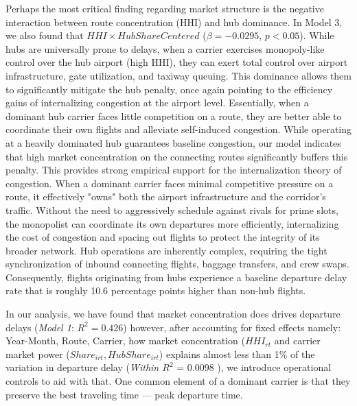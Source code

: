 \documentclass[preprint,12pt,authoryear]{elsarticle}
\begin{document}
Perhaps the most critical finding regarding market structure is the negative interaction between route concentration (HHI) and hub dominance. In Model 3, we also found that $HHI \times HubShareCentered$ ($\beta = -0.0295$, $p < 0.05$). While hubs are universally prone to delays, when a carrier exercises monopoly-like control over the hub airport (high HHI), they can exert total control over airport infrastructure, gate utilization, and taxiway queuing. This dominance allows them to significantly mitigate the hub penalty, once again pointing to the efficiency gains of internalizing congestion at the airport level. Essentially, when a dominant hub carrier faces little competition on a route, they are better able to coordinate their own flights and alleviate self-induced congestion.  While operating at a heavily dominated hub guarantees baseline congestion, our model indicates that high market concentration on the connecting routes significantly buffers this penalty. This provides strong empirical support for the internalization theory of congestion. When a dominant carrier faces minimal competitive pressure on a route, it effectively "owns" both the airport infrastructure and the corridor's traffic. Without the need to aggressively schedule against rivals for prime slots, the monopolist can coordinate its own departures more efficiently, internalizing the cost of congestion and spacing out flights to protect the integrity of its broader network. Hub operations are inherently complex, requiring the tight synchronization of inbound connecting flights, baggage transfers, and crew swaps. Consequently, flights originating from hubs experience a baseline departure delay rate that is roughly 10.6 percentage points higher than non-hub flights. 

In our analysis, we have found that market concentration does drives departure delays (\textit{Model 1}: $R^2 = 0.426$) however, after accounting for fixed effects namely: Year-Month, Route, Carrier, how market concentration ($HHI_{rt}$ and carrier market power ($Share_{irt}, HubShare_{irt}$) explains almost less than 1\% of the variation in departure delay (\textit{Within $R^2$} = $0.0098$ ), we introduce operational controls to aid with that. One common element of a dominant carrier is that they preserve the best traveling time --- peak departure time. 
\end{document}
